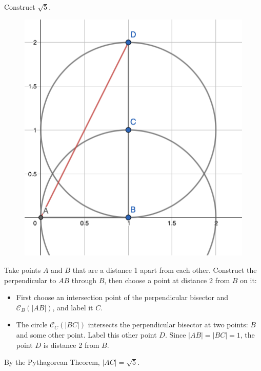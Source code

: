 \documentclass[twoside,10pt]{article}
\begin{document}
\newpage

\begin{exer}[3.24]
Construct $\sqrt{5} $.
\end{exer}

\begin{figure}[H]
	\centering
	\includegraphics[scale=0.4]{fig/24}
\end{figure}

Take points $A$ and $B$ that are a distance 1 apart from each other. Construct the perpendicular to $AB$ through $B$, then choose a point at distance 2 from $B$ on it:
\begin{itemize}
	\item First choose an intersection point of the perpendicular bisector and $\mathcal{C}_{B}(|AB|)$, and label it $C$.
	\item The circle $\mathcal{C}_{C}(|BC|)$ intersects the perpendicular bisector at two points: $B$ and some other point. Label this other point $D$. Since $|AB|=|BC|=1$, the point $D$ is distance 2 from $B$.
\end{itemize}
By the Pythagorean Theorem, $|AC| = \sqrt{5} $.

\newpage
\end{document}
